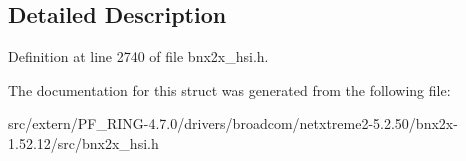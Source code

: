 \subsection{Detailed Description}


Definition at line 2740 of file bnx2x\_\-hsi.h.



The documentation for this struct was generated from the following file:\begin{DoxyCompactItemize}
\item 
src/extern/PF\_\-RING-\/4.7.0/drivers/broadcom/netxtreme2-\/5.2.50/bnx2x-\/1.52.12/src/bnx2x\_\-hsi.h\end{DoxyCompactItemize}
